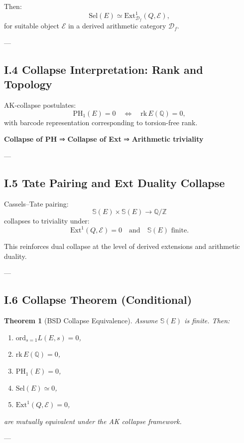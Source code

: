 \documentclass[11pt]{article}
\newcommand{\Sha}{\mathbb{S}}
\newtheorem{theorem}{Theorem}[section]
\begin{document}
Then:
\[
\mathrm{Sel}(E) \simeq \mathrm{Ext}^1_{\mathcal{D}_f}(Q, \mathcal{E}),
\]
for suitable object $\mathcal{E}$ in a derived arithmetic category $\mathcal{D}_f$.

---

\subsection*{I.4 Collapse Interpretation: Rank and Topology}

AK-collapse postulates:
\[
\mathrm{PH}_1(E) = 0 \quad \Leftrightarrow \quad \mathrm{rk}\,E(\mathbb{Q}) = 0,
\]
with barcode representation corresponding to torsion-free rank.

\textbf{Collapse of PH} ⇒ \textbf{Collapse of Ext} ⇒ \textbf{Arithmetic triviality}

---

\subsection*{I.5 Tate Pairing and Ext Duality Collapse}

Cassels–Tate pairing:
\[
\Sha(E) \times \Sha(E) \to \mathbb{Q}/\mathbb{Z}
\]
collapses to triviality under:
\[
\mathrm{Ext}^1(Q, \mathcal{E}) = 0 \quad \text{and} \quad \Sha(E) \text{ finite}.
\]

This reinforces dual collapse at the level of derived extensions and arithmetic duality.

---

\subsection*{I.6 Collapse Theorem (Conditional)}

\begin{theorem}[BSD Collapse Equivalence]
Assume $\Sha(E)$ is finite. Then:
\begin{enumerate}
  \item $\mathrm{ord}_{s=1} L(E,s) = 0$,
  \item $\mathrm{rk}\,E(\mathbb{Q}) = 0$,
  \item $\mathrm{PH}_1(E) = 0$,
  \item $\mathrm{Sel}(E) \simeq 0$,
  \item $\mathrm{Ext}^1(Q, \mathcal{E}) = 0$,
\end{enumerate}
are mutually equivalent under the AK collapse framework.
\end{theorem}

---
\end{document}
